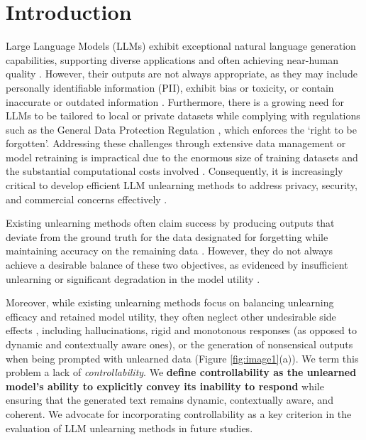 \vspace{-0.7cm}
\section{Introduction}\label{sec:intro}



Large Language Models (LLMs) exhibit exceptional natural language generation capabilities, supporting diverse applications %
\cite{gpt, gpt4} and often achieving near-human quality \cite{abdali2024decoding}.
%
However, their outputs are not always appropriate, as they may include personally identifiable information (PII), exhibit bias or toxicity, or contain inaccurate or outdated information \cite{kotek2023gender, motoki2023more, bender2021dangers, wen2023unveiling, nasr2023scalable, barrett2023identifying}. 
%
Furthermore, there is a growing need for LLMs to be tailored to local or private datasets while complying with regulations such as the General Data Protection Regulation \cite{gdpr17}, which enforces the `right to be forgotten'. 
%
Addressing these challenges through extensive data management or model retraining is impractical due to the enormous size of training datasets and the substantial computational costs involved \cite{llm_cost}. Consequently, it is increasingly critical to develop efficient LLM unlearning methods to address privacy, security, and commercial concerns effectively \cite{cc100, wenzek2019ccnet}.

Existing unlearning methods often claim success by producing outputs that deviate from the ground truth for the data designated for forgetting while maintaining accuracy on the remaining data \citep{liu2024rethinking}. 
%
However, they do not always achieve a desirable balance of these two objectives, as evidenced by insufficient unlearning or significant degradation in the model utility \citep{qiu2024pistol}. 

Moreover, while existing unlearning methods focus on balancing unlearning efficacy and retained model utility, they often neglect other undesirable side effects \citep{yao2023large, wang2024unlearning, liu2024rethinking, blanco2025digital}, including hallucinations, 
rigid and monotonous responses (as opposed to dynamic and contextually aware ones), 
or the generation of nonsensical outputs 
when being prompted with unlearned data (Figure \ref{fig:image1}(a)). We term this problem a lack of \textit{controllability}. We \textbf{define controllability as the unlearned model's
ability to explicitly convey its inability to respond} while ensuring that the generated
text remains dynamic, contextually aware, and coherent. We advocate for incorporating controllability as
a key criterion in the evaluation of LLM unlearning methods in future studies.


